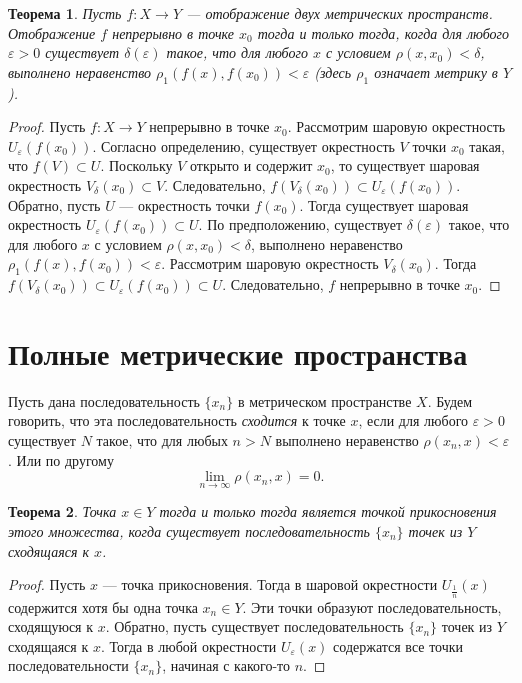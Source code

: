 \documentclass[12pt, titlepage, oneside]{amsbook}
\newtheorem{theorem}{Теорема}[chapter]
\theoremstyle{definition}
\theoremstyle{remark}
\begin{document}
 \begin{theorem}
\label{Met8}
Пусть $f\colon X\rightarrow Y$ --- отображение двух метрических пространств. Отображение $f$ непрерывно в точке $x_0$ тогда и только тогда, когда для любого $\varepsilon>0$ существует $\delta(\varepsilon)$ такое, что для любого $x$ с условием $\rho(x,x_0)<\delta$, выполнено неравенство $\rho_1(f(x),f(x_0))<\varepsilon$ (здесь $\rho_1$ означает метрику в $Y$).
\end{theorem}

\begin{proof}
Пусть $f\colon X\rightarrow Y$ непрерывно в точке $x_0$. Рассмотрим шаровую окрестность $U_{\varepsilon}(f(x_0))$. Согласно определению, существует окрестность $V$ точки $x_0$ такая, что $f(V)\subset U$. Поскольку $V$ открыто и содержит $x_0$, то существует шаровая окрестность $V_{\delta}(x_0)\subset V$. Следовательно, $f(V_{\delta}(x_0))\subset U_{\varepsilon}(f(x_0))$. Обратно, пусть $U$ --- окрестность точки $f(x_0)$. Тогда существует шаровая окрестность $U_{\varepsilon}(f(x_0))\subset U$. По предположению, существует $\delta(\varepsilon)$ такое, что для любого $x$ с условием $\rho(x,x_0)<\delta$, выполнено неравенство $\rho_1(f(x),f(x_0))<\varepsilon$. Рассмотрим шаровую окрестность $V_{\delta}(x_0)$. Тогда $f(V_{\delta}(x_0))\subset U_{\varepsilon}(f(x_0))\subset U$. Следовательно, $f$ непрерывно в точке $x_0$.
\end{proof}

\section{Полные метрические пространства}

Пусть дана последовательность $\{x_n\}$ в метрическом пространстве $X$. Будем говорить, что эта последовательность \emph{сходится} к точке $x$, если для любого $\varepsilon>0$ существует $N$ такое, что для любых $n>N$ выполнено неравенство $\rho(x_n,x)<\varepsilon$. Или по другому $$\lim\limits_{n\rightarrow\infty}\rho(x_n,x)=0.$$

 \begin{theorem}
\label{Pol1}
Точка $x\in Y$ тогда и только тогда является точкой прикосновения этого множества, когда существует последовательность $\{x_n\}$ точек из $Y$ сходящаяся к $x$.
\end{theorem}

\begin{proof}
Пусть $x$ --- точка прикосновения. Тогда в шаровой окрестности $U_{\frac{1}{n}}(x)$ содержится хотя бы одна точка $x_n\in Y$. Эти точки образуют последовательность, сходящуюся к $x$. Обратно, пусть существует последовательность $\{x_n\}$ точек из $Y$ сходящаяся к $x$. Тогда в любой окрестности $U_{\varepsilon}(x)$ содержатся все точки последовательности $\{x_n\}$, начиная с какого-то $n$.
\end{proof}
\end{document}
